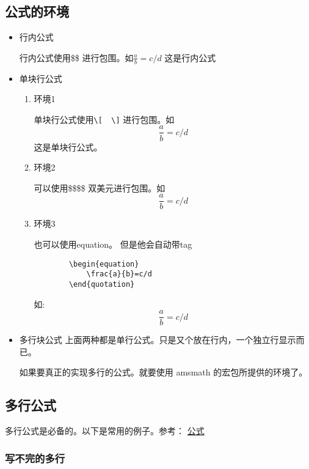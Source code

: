\documentclass[utf-8,a4paper,11pt]{article}
\begin{document}
\subsection{公式的环境}
\begin{itemize}
    \item 行内公式

          行内公式使用\$\$ 进行包围。如$\frac{a}{b}=c/d$ 这是行内公式

    \item 单块行公式
          \begin{enumerate}
              \item 环境1

                    单块行公式使用\verb!\[  \]! 进行包围。如\[\frac{a}{b}=c/d\] 这是单块行公式。
              \item 环境2

                    可以使用\$\$\quad\$\$ 双美元进行包围。如 $$\frac{a}{b}=c/d$$
              \item 环境3

                    也可以使用equation。 但是他会自动带tag
                    \begin{lstlisting}
        \begin{equation}
            \frac{a}{b}=c/d
        \end{quotation}
    \end{lstlisting}

                    如:
                    \begin{equation}
                        \frac{a}{b}=c/d
                    \end{equation}
          \end{enumerate}
    \item 多行块公式
          上面两种都是单行公式。只是又个放在行内，一个独立行显示而已。

          如果要真正的实现多行的公式。就要使用 amsmath 的宏包所提供的环境了。

\end{itemize}

\subsection{多行公式}

多行公式是必备的。以下是常用的例子。参考： \href{https://matnoble.me/tech/latex/multi-line-equations/}{公式}

\subsubsection{写不完的多行}
\end{document}
